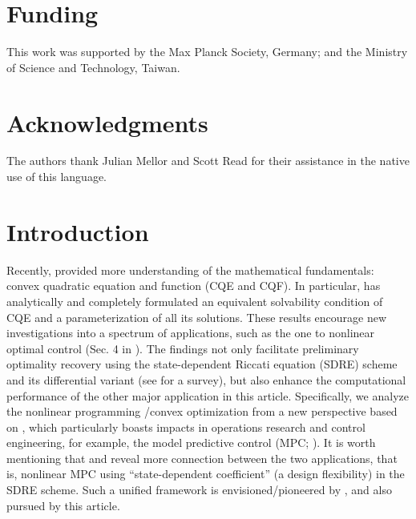 \documentclass{imaman}
\numberwithin{equation}{section}
\begin{document}
\section*{Funding}
This work was supported by the Max Planck Society, Germany; and the Ministry of Science and Technology, Taiwan.

\section*{Acknowledgments}
The authors thank Julian Mellor and Scott Read for their assistance in the native use of this language.


\newpage
\setcounter{page}{1}

\section{Introduction}
\label{Sec_Intro}
Recently, \cite{LiLiHs:20} provided more understanding of the mathematical fundamentals: convex quadratic equation and function (CQE and CQF). In particular, \cite{LiLiHs:20} has analytically and completely formulated an equivalent solvability condition of CQE and a parameterization of all its solutions. These results encourage new investigations into a spectrum of applications, such as the one to nonlinear optimal control (Sec. 4 in \cite{LiLiHs:20}). The findings not only facilitate preliminary optimality recovery using the state-dependent Riccati equation (SDRE) scheme and its differential variant (see \cite{Cim:10} for a survey), but also enhance the computational performance of the other major application in this article. Specifically, we analyze the nonlinear programming \cite{Lu(Ye):03(16)}/convex optimization \cite{BoVa:04} from a new perspective based on \cite{LiLiHs:20}, which particularly boasts impacts in operations research and control engineering, for example, the model predictive control (MPC; \cite{CiFa:12}). It is worth mentioning that  \cite{KaWaLiShPe:18} and  \cite{QuSu:18} reveal more connection between the two applications, that is, nonlinear MPC using ``state-dependent coefficient'' (a design flexibility) in the SDRE scheme. Such a unified framework is envisioned/pioneered by  \cite{BeMoDuPi:02}, and also pursued by this article.
\end{document}
